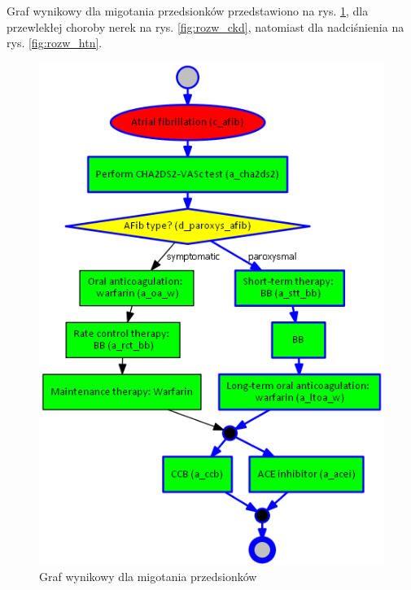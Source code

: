 Graf wynikowy dla migotania przedsionków przedstawiono na rys. \ref{fig:rozw_afib}, dla przewlekłej choroby nerek na rys. \ref{fig:rozw_ckd}, natomiast dla nadciśnienia na rys. \ref{fig:rozw_htn}.
\begin{figure}[H]
\centering
\includegraphics[scale=0.5]{img/rozwiazanie1afib-ver-4.png}
\caption{Graf wynikowy dla migotania przedsionków}
\label{fig:rozw_afib}
\end{figure}
